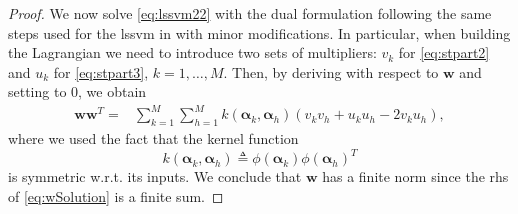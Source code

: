 \documentclass[draftcls,onecolumn,12pt]{IEEEtran}
\newcommand{\wrt}{w.r.t. }
\begin{document}
\begin{proof}
We now solve \eqref{eq:lssvm22} with the dual formulation following the same steps used for the \ac{lssvm} in \cite{Suykens1999} with minor modifications. In particular, when building the Lagrangian we need to introduce two sets of multipliers: $v_k$ for \eqref{eq:stpart2} and $u_k$ for \eqref{eq:stpart3}, $k=1,\dots, M$. Then, by deriving with respect to $\mathbf{w}$ and setting to 0, we obtain 
\begin{equation}
\label{eq:wSolution}
\begin{aligned}
	\mathbf{w}\mathbf{w}^T =&  \sum_{k=1}^{M} \sum_{h=1}^{M} k(\bm{\alpha}_k,\bm{\alpha}_h) (v_kv_h + u_ku_h -2 v_ku_h),
\end{aligned}
\end{equation}
where we used the fact that the kernel function
\begin{equation}
	k(\bm{\alpha}_k,\bm{\alpha}_h) \triangleq \phi(\bm{\alpha}_k) \phi(\bm{\alpha}_h)^T
\end{equation} is symmetric \wrt its inputs. We conclude that $\mathbf{w}$ has a finite norm since the rhs of \eqref{eq:wSolution} is a finite sum.

\end{proof}
\end{document}
